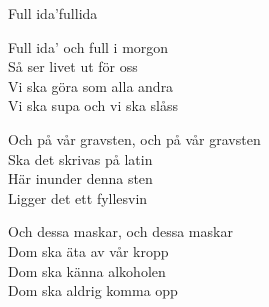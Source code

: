 \begin{song}{Full ida'}{fullida}
\begin{vers}
Full ida' och full i morgon\\
Så ser livet ut för oss\\
Vi ska göra som alla andra\\
Vi ska supa och vi ska slåss\\
\end{vers}
\begin{vers}
Och på vår gravsten, och på vår gravsten\\
Ska det skrivas på latin\\
Här inunder denna sten\\
Ligger det ett fyllesvin\\
\end{vers}
\begin{vers}
Och dessa maskar, och dessa maskar\\
Dom ska äta av vår kropp\\
Dom ska känna alkoholen\\
Dom ska aldrig komma opp\\
\end{vers}
\end{song}
